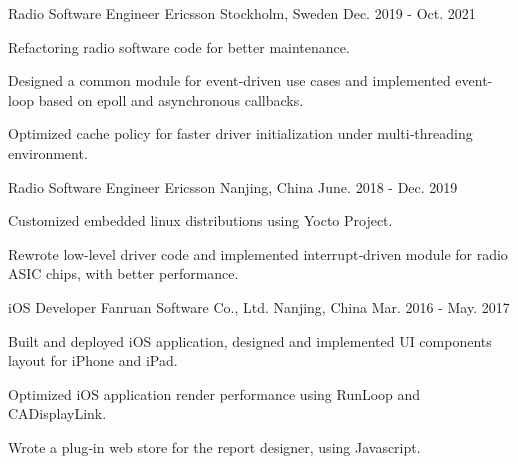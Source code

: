 \begin{cventries}
 \cventry
    {Radio Software Engineer} %
    {Ericsson} %
    {Stockholm, Sweden} %
    {Dec. 2019 - Oct. 2021} %
    {
      \begin{cvitems} %
        \item {Refactoring radio software code for better maintenance.}
        \item {Designed a common module for event‐driven use cases and implemented event-loop based on epoll and asynchronous callbacks.}
        \item {Optimized cache policy for faster driver initialization under multi‐threading environment.}
      \end{cvitems}
    }

 \cventry
    {Radio Software Engineer} %
    {Ericsson} %
    {Nanjing, China} %
    {June. 2018 - Dec. 2019} %
    {
      \begin{cvitems} %
        \item {Customized embedded linux distributions using Yocto Project.}
        \item {Rewrote low-level driver code and implemented interrupt‐driven module for radio ASIC chips, with better performance.}
      \end{cvitems}
    }

 \cventry
    {iOS Developer} %
    {Fanruan Software Co., Ltd.} %
    {Nanjing, China} %
    {Mar. 2016 - May. 2017} %
    {
      \begin{cvitems} %
        \item {Built and deployed iOS application, designed and implemented UI components layout for iPhone and iPad.}
        \item {Optimized iOS application render performance using RunLoop and CADisplayLink.}
        \item {Wrote a plug‐in web store for the report designer, using Javascript.}
      \end{cvitems}
    }

\end{cventries}

